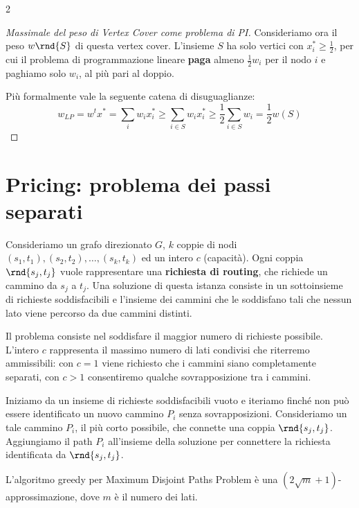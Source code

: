 \documentclass[\main/main.tex]{subfiles}
\begin{document}
\begin{multicols}{2}
\begin{proof}[Massimale del peso di Vertex Cover come problema di PI]
    Consideriamo ora il peso \(w\rnd{S}\) di questa vertex cover. L'insieme \(S\) ha solo vertici con \(x_{i}^{*} \geq \frac{1}{2}\), per cui il problema di programmazione lineare \textbf{paga} almeno \(\frac{1}{2} w_{i}\) per il nodo \(i\) e paghiamo solo \(w_i\), al più pari al doppio.
    
    Più formalmente vale la seguente catena di disuguaglianze:
    \[w_{L P} = w^{t} x^{*}=\sum_{i} w_{i} x_{i}^{*} \geq \sum_{i \in S} w_{i} x_{i}^{*} \geq \frac{1}{2} \sum_{i \in S} w_{i}=\frac{1}{2} w(S)\]
\end{proof}
\end{multicols}
\clearpage
\section{Pricing: problema dei passi separati}
\begin{problem}
    Consideriamo un grafo direzionato \(G\), \(k\) coppie di nodi \(\left(s_{1}, t_{1}\right),\left(s_{2}, t_{2}\right), \ldots,\left(s_{k}, t_{k}\right)\) ed un intero \(c\) (capacità). Ogni coppia \(\rnd{s_j, t_j}\) vuole rappresentare una \textbf{richiesta di routing}, che richiede un cammino da \(s_j\) a \(t_j\). Una soluzione di questa istanza consiste in un sottoinsieme di richieste soddisfacibili e l'insieme dei cammini che le soddisfano tali che nessun lato viene percorso da due cammini distinti. 
    
    Il problema consiste nel soddisfare il maggior numero di richieste possibile. L'intero \(c\) rappresenta il massimo numero di lati condivisi che riterremo ammissibili: con \(c=1\) viene richiesto che i cammini siano completamente separati, con \(c>1\) consentiremo qualche sovrapposizione tra i cammini.
\end{problem}
\begin{definition}
    Iniziamo da un insieme di richieste soddisfacibili vuoto e iteriamo finché non può essere identificato un nuovo cammino \(P_i\) senza sovrapposizioni. Consideriamo un tale cammino \(P_i\), il più corto possibile, che connette una coppia \(\rnd{s_j, t_j}\). Aggiungiamo il path \(P_i\) all'insieme della soluzione per connettere la richiesta identificata da \(\rnd{s_j, t_j}\).
\end{definition}
\begin{lemma}
    L'algoritmo greedy per Maximum Disjoint Paths Problem è una \((2 \sqrt{m}+1)\)-approssimazione, dove \(m\) è il numero dei lati.
\end{lemma}
\end{document}
